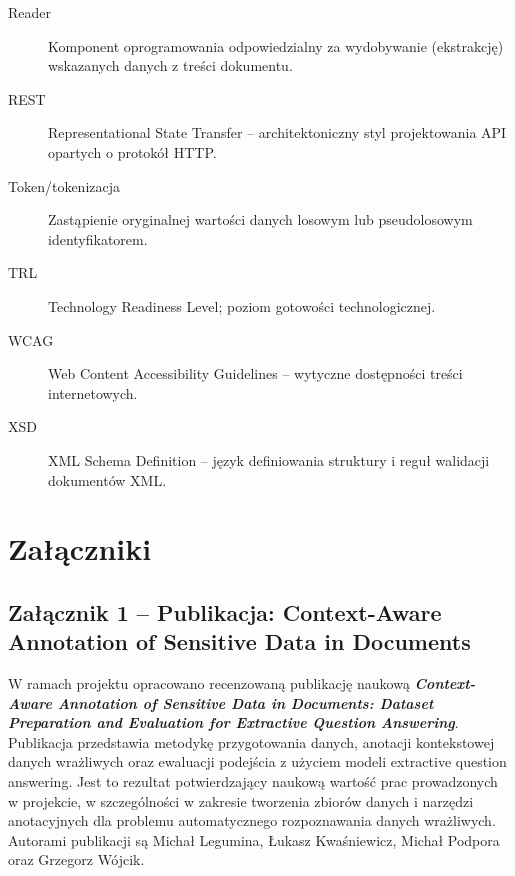 \documentclass[12pt,a4paper]{report}
\begin{document}
\begin{description}
    \item[Reader] Komponent oprogramowania odpowiedzialny za wydobywanie (ekstrakcję) wskazanych danych z treści dokumentu.
    \item[REST] Representational State Transfer -- architektoniczny styl projektowania API opartych o protokół HTTP.
    \item[Token/tokenizacja] Zastąpienie oryginalnej wartości danych losowym lub pseudolosowym identyfikatorem.
    \item[TRL] Technology Readiness Level; poziom gotowości technologicznej.
    \item[WCAG] Web Content Accessibility Guidelines -- wytyczne dostępności treści internetowych.
    \item[XSD] XML Schema Definition -- język definiowania struktury i reguł walidacji dokumentów XML.
\end{description}


{}
\nocite{legumina2025contextawareannotation}
\nocite{legumina2025realisticpersonaldata}




\appendix

\chapter*{Załączniki}

\section*{Załącznik 1 -- Publikacja: Context-Aware Annotation of Sensitive Data in Documents}

W ramach projektu opracowano recenzowaną publikację naukową \textit{\textbf{Context-Aware Annotation of Sensitive Data in Documents: Dataset Preparation and Evaluation for Extractive Question Answering}}. Publikacja przedstawia metodykę przygotowania danych, anotacji kontekstowej danych wrażliwych oraz ewaluacji podejścia z użyciem modeli extractive question answering. Jest to rezultat potwierdzający naukową wartość prac prowadzonych w projekcie, w szczególności w zakresie tworzenia zbiorów danych i narzędzi anotacyjnych dla problemu automatycznego rozpoznawania danych wrażliwych. Autorami publikacji są Michał Legumina, Łukasz Kwaśniewicz, Michał Podpora oraz Grzegorz Wójcik.
\end{document}
